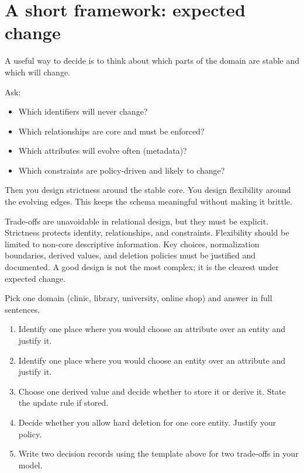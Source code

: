 \section{A short framework: expected change}
A useful way to decide is to think about which parts of the domain are stable and which will change.

Ask:
\begin{itemize}[leftmargin=*,nosep]
  \item Which identifiers will never change?
  \item Which relationships are core and must be enforced?
  \item Which attributes will evolve often (metadata)?
  \item Which constraints are policy-driven and likely to change?
\end{itemize}

Then you design strictness around the stable core.
You design flexibility around the evolving edges.
This keeps the schema meaningful without making it brittle.

\begin{chaptersummary}
Trade-offs are unavoidable in relational design, but they must be explicit.
Strictness protects identity, relationships, and constraints.
Flexibility should be limited to non-core descriptive information.
Key choices, normalization boundaries, derived values, and deletion policies must be justified and documented.
A good design is not the most complex; it is the clearest under expected change.
\end{chaptersummary}

\begin{exercisebox}
Pick one domain (clinic, library, university, online shop) and answer in full sentences.
\begin{enumerate}[label=\arabic*.]
  \item Identify one place where you would choose an attribute over an entity and justify it.
  \item Identify one place where you would choose an entity over an attribute and justify it.
  \item Choose one derived value and decide whether to store it or derive it. State the update rule if stored.
  \item Decide whether you allow hard deletion for one core entity. Justify your policy.
  \item Write two decision records using the template above for two trade-offs in your model.
\end{enumerate}
\end{exercisebox}
